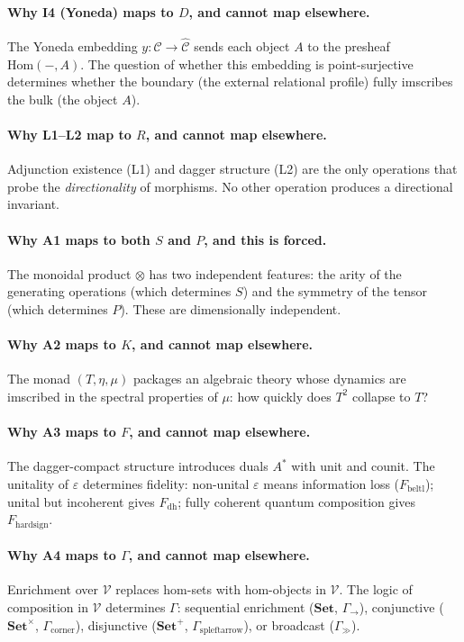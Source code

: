 \documentclass[12pt,a4paper]{article}
\begin{document}
\paragraph{Why I4 (Yoneda) maps to $D$, and cannot map elsewhere.}
The Yoneda embedding $y: \mathcal{C} \to \hat{\mathcal{C}}$ sends each object $A$ to the presheaf $\text{Hom}(-,A)$. The question of whether this embedding is point-surjective determines whether the boundary (the external relational profile) fully imscribes the bulk (the object $A$).

\paragraph{Why L1--L2 map to $R$, and cannot map elsewhere.}
Adjunction existence (L1) and dagger structure (L2) are the only operations that probe the \emph{directionality} of morphisms. No other operation produces a directional invariant.

\paragraph{Why A1 maps to both $S$ and $P$, and this is forced.}
The monoidal product $\otimes$ has two independent features: the arity of the generating operations (which determines $S$) and the symmetry of the tensor (which determines $P$). These are dimensionally independent.

\paragraph{Why A2 maps to $K$, and cannot map elsewhere.}
The monad $(T, \eta, \mu)$ packages an algebraic theory whose dynamics are imscribed in the spectral properties of $\mu$: how quickly does $T^2$ collapse to $T$?

\paragraph{Why A3 maps to $F$, and cannot map elsewhere.}
The dagger-compact structure introduces duals $A^*$ with unit and counit. The unitality of $\varepsilon$ determines fidelity: non-unital $\varepsilon$ means information loss ($F_{\text{beltl}}$); unital but incoherent gives $F_{\text{dh}}$; fully coherent quantum composition gives $F_{\text{hardsign}}$.

\paragraph{Why A4 maps to $\Gamma$, and cannot map elsewhere.}
Enrichment over $\mathcal{V}$ replaces hom-sets with hom-objects in $\mathcal{V}$. The logic of composition in $\mathcal{V}$ determines $\Gamma$: sequential enrichment ($\mathbf{Set}$, $\Gamma_\to$), conjunctive ($\mathbf{Set}^\times$, $\Gamma_{\text{corner}}$), disjunctive ($\mathbf{Set}^+$, $\Gamma_{\text{spleftarrow}}$), or broadcast ($\Gamma_{\gg}$).
\end{document}
